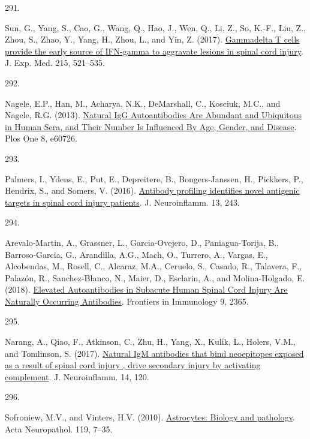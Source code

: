 \documentclass[
]{article}
\newlength{\cslhangindent}
\newlength{\csllabelwidth}
\newlength{\cslentryspacingunit} %
\newenvironment{CSLReferences}[2] %
 {%
  \setlength{\parindent}{0pt}
  \ifodd #1
  \let\oldpar\par
  \def\par{\hangindent=\cslhangindent\oldpar}
  \fi
  \setlength{\parskip}{#2\cslentryspacingunit}
 }%
 {}
\newcommand{\CSLLeftMargin}[1]{\parbox[t]{\csllabelwidth}{#1}}
\newcommand{\CSLRightInline}[1]{\parbox[t]{\linewidth - \csllabelwidth}{#1}\break}
\begin{document}
\begin{CSLReferences}{0}{0}
\leavevmode{}%
\CSLLeftMargin{291. }
\CSLRightInline{Sun, G., Yang, S., Cao, G., Wang, Q., Hao, J., Wen, Q., Li, Z., So, K.-F., Liu, Z., Zhou, S., Zhao, Y., Yang, H., Zhou, L., and Yin, Z. (2017). \href{https://doi.org/10.1084/jem.20170686}{Gammadelta {T} cells provide the early source of {IFN-gamma} to aggravate lesions in spinal cord injury}. J. Exp. Med. 215, 521--535.}

\leavevmode{}%
\CSLLeftMargin{292. }
\CSLRightInline{Nagele, E.P., Han, M., Acharya, N.K., DeMarshall, C., Kosciuk, M.C., and Nagele, R.G. (2013). \href{https://doi.org/10.1371/journal.pone.0060726}{Natural {IgG Autoantibodies Are Abundant} and {Ubiquitous} in {Human Sera}, and {Their Number Is Influenced By Age}, {Gender}, and {Disease}}. Plos One 8, e60726.}

\leavevmode{}%
\CSLLeftMargin{293. }
\CSLRightInline{Palmers, I., Ydens, E., Put, E., Depreitere, B., Bongers-Janssen, H., Pickkers, P., Hendrix, S., and Somers, V. (2016). \href{https://doi.org/10.1186/s12974-016-0713-5}{Antibody profiling identifies novel antigenic targets in spinal cord injury patients}. J. Neuroinflamm. 13, 243.}

\leavevmode{}%
\CSLLeftMargin{294. }
\CSLRightInline{Arevalo-Martin, A., Grassner, L., Garcia-Ovejero, D., Paniagua-Torija, B., Barroso-Garcia, G., Arandilla, A.G., Mach, O., Turrero, A., Vargas, E., Alcobendas, M., Rosell, C., Alcaraz, M.A., Ceruelo, S., Casado, R., Talavera, F., Palazón, R., Sanchez-Blanco, N., Maier, D., Esclarin, A., and Molina-Holgado, E. (2018). \href{https://doi.org/10.3389/fimmu.2018.02365}{Elevated {Autoantibodies} in {Subacute Human Spinal Cord Injury Are Naturally Occurring Antibodies}}. Frontiers in Immunology 9, 2365.}

\leavevmode{}%
\CSLLeftMargin{295. }
\CSLRightInline{Narang, A., Qiao, F., Atkinson, C., Zhu, H., Yang, X., Kulik, L., Holers, V.M., and Tomlinson, S. (2017). \href{https://doi.org/10.1186/s12974-017-0894-6}{Natural {IgM} antibodies that bind neoepitopes exposed as a result of spinal cord injury , drive secondary injury by activating complement}. J. Neuroinflamm. 14, 120.}

\leavevmode{}%
\CSLLeftMargin{296. }
\CSLRightInline{Sofroniew, M.V., and Vinters, H.V. (2010). \href{https://doi.org/10.1007/s00401-009-0619-8}{Astrocytes: Biology and pathology}. Acta Neuropathol. 119, 7--35.}


\end{CSLReferences}
\end{document}
